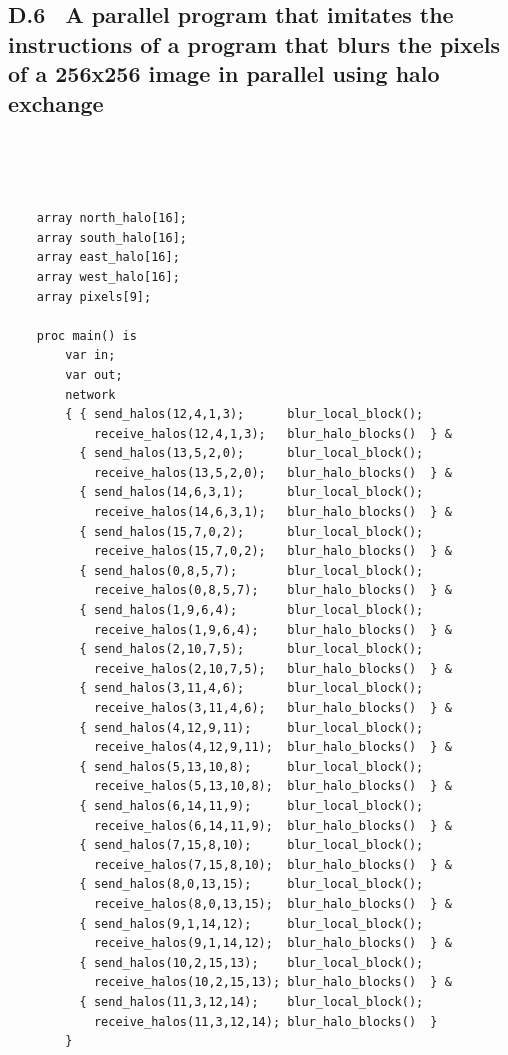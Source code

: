 \documentclass[a4paper, 12pt]{article}
\begin{document}
\newpage
\subsection*{D.6 \ A parallel program that imitates the instructions of a program that blurs the pixels of a 256x256 image in parallel using halo exchange}
\ 
\begin{lstlisting}


    array north_halo[16];
    array south_halo[16];
    array east_halo[16];
    array west_halo[16];
    array pixels[9];

    proc main() is
        var in;
        var out;
        network 
        { { send_halos(12,4,1,3);      blur_local_block(); 
            receive_halos(12,4,1,3);   blur_halo_blocks()  } &
          { send_halos(13,5,2,0);      blur_local_block(); 
            receive_halos(13,5,2,0);   blur_halo_blocks()  } &
          { send_halos(14,6,3,1);      blur_local_block(); 
            receive_halos(14,6,3,1);   blur_halo_blocks()  } &
          { send_halos(15,7,0,2);      blur_local_block(); 
            receive_halos(15,7,0,2);   blur_halo_blocks()  } &
          { send_halos(0,8,5,7);       blur_local_block(); 
            receive_halos(0,8,5,7);    blur_halo_blocks()  } &
          { send_halos(1,9,6,4);       blur_local_block(); 
            receive_halos(1,9,6,4);    blur_halo_blocks()  } &
          { send_halos(2,10,7,5);      blur_local_block(); 
            receive_halos(2,10,7,5);   blur_halo_blocks()  } &
          { send_halos(3,11,4,6);      blur_local_block(); 
            receive_halos(3,11,4,6);   blur_halo_blocks()  } &
          { send_halos(4,12,9,11);     blur_local_block(); 
            receive_halos(4,12,9,11);  blur_halo_blocks()  } &
          { send_halos(5,13,10,8);     blur_local_block(); 
            receive_halos(5,13,10,8);  blur_halo_blocks()  } &
          { send_halos(6,14,11,9);     blur_local_block(); 
            receive_halos(6,14,11,9);  blur_halo_blocks()  } &
          { send_halos(7,15,8,10);     blur_local_block(); 
            receive_halos(7,15,8,10);  blur_halo_blocks()  } &
          { send_halos(8,0,13,15);     blur_local_block(); 
            receive_halos(8,0,13,15);  blur_halo_blocks()  } &
          { send_halos(9,1,14,12);     blur_local_block(); 
            receive_halos(9,1,14,12);  blur_halo_blocks()  } &
          { send_halos(10,2,15,13);    blur_local_block(); 
            receive_halos(10,2,15,13); blur_halo_blocks()  } &
          { send_halos(11,3,12,14);    blur_local_block(); 
            receive_halos(11,3,12,14); blur_halo_blocks()  } 
        }


\end{lstlisting}
\end{document}
